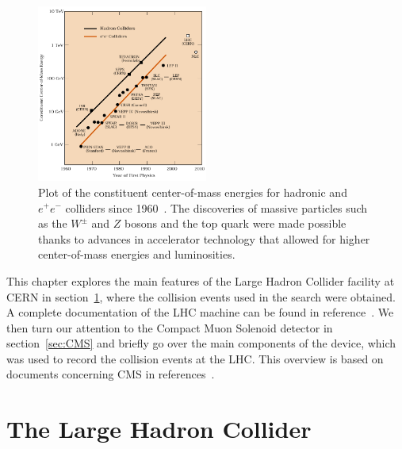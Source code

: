 \begin{figure}[htbp]
  \centering
  \includegraphics[width=0.5\textwidth]{fig/experiment/ecm_livingston.pdf}
  \caption[
    Plot of the constituent center-of-mass energies for hadronic and $e^+e^-$ colliders since 1960.
    The discoveries of massive particles such as the $W^\pm$ and $Z$ bosons and the top quark were made possible thanks to advances in accelerator technology that allowed for higher center-of-mass energies and luminosities.
  ]{
    Plot of the constituent center-of-mass energies for hadronic and $e^+e^-$ colliders since 1960~\cite{Panofsky}.
    The discoveries of massive particles such as the $W^\pm$ and $Z$ bosons and the top quark were made possible thanks to advances in accelerator technology that allowed for higher center-of-mass energies and luminosities.
  }
  \label{fig:ECMplot}
\end{figure}

This chapter explores the main features of the Large Hadron Collider facility at CERN in section~\ref{sec:LHC}, where the collision events used in the search were obtained.
A complete documentation of the LHC machine can be found in reference~\cite{Evans:1129806}.
We then turn our attention to the Compact Muon Solenoid detector in section~\ref{sec:CMS} and briefly go over the main components of the device, which was used to record the collision events at the LHC.
This overview is based on documents concerning CMS in references~\cite{Chatrchyan:1129810,taylor_2011}.

\section{The Large Hadron Collider}
\label{sec:LHC}


